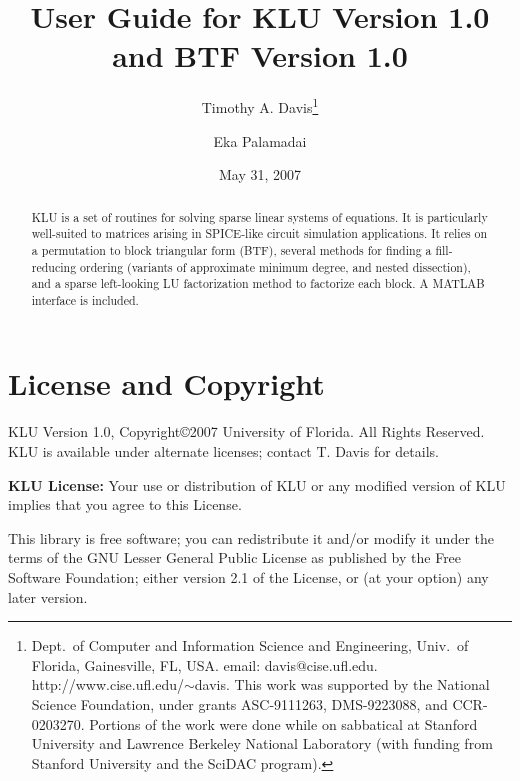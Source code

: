 \documentclass[11pt]{article}
\begin{document}

\title{User Guide for KLU Version 1.0 and BTF Version 1.0}
\author{
Timothy A. Davis\thanks{
Dept.~of Computer and Information Science and Engineering,
Univ.~of Florida, Gainesville, FL, USA.
email: davis@cise.ufl.edu.
http://www.cise.ufl.edu/$\sim$davis.
This work was supported by the National
Science Foundation, under grants ASC-9111263, DMS-9223088, and CCR-0203270.
Portions of the work were done while on sabbatical at Stanford University
and Lawrence Berkeley National Laboratory (with funding from Stanford
University and the SciDAC program).
}
\and Eka Palamadai}

\date{May 31, 2007}
\maketitle

\begin{abstract}
KLU is a set of routines for solving sparse linear systems of equations.
It is particularly well-suited to matrices arising in SPICE-like circuit
simulation applications.
It relies on a permutation to block triangular form (BTF), several methods
for finding a fill-reducing ordering (variants of approximate minimum degree,
and nested dissection), and a sparse left-looking LU factorization method
to factorize each block.  A MATLAB interface is included.
\end{abstract}

\newpage
\tableofcontents
\newpage

\section{License and Copyright}

KLU Version 1.0, Copyright\copyright 2007 University of Florida.
All Rights Reserved.
KLU is available under alternate licenses; contact T. Davis for details.

{\bf KLU License:}
    Your use or distribution of KLU or any modified version of
    KLU implies that you agree to this License.

    This library is free software; you can redistribute it and/or
    modify it under the terms of the GNU Lesser General Public
    License as published by the Free Software Foundation; either
    version 2.1 of the License, or (at your option) any later version.
\end{document}
